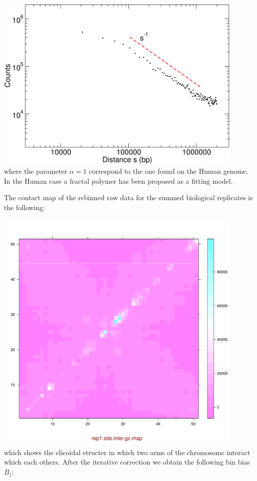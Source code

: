 \documentclass[12pt,a4paper,notitlepage]{article}
\begin{document}
\vspace{.5cm}\hspace{2cm}\includegraphics[page=1,width=12cm]{distcaulo}\\
where the parameter $\alpha = 1$ correspond to the one found on the
Human genome\cite{Lieberman2009}. In the Human case a fractal polymer
has been proposed as a fitting model.

The contact map of the rebinned raw data for the summed biological
replicates is the following:

\vspace{.5cm}\hspace{2cm}\includegraphics[page=4,width=12cm]{caulobacter/out}\\
which shows the elicoidal structer in which two arms of the chromosome
interact which each others. After the iterative correction we obtain
the following bin bias $B_j$:
\end{document}
